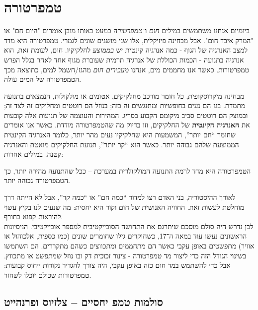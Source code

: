 \documentclass[
  hebrew,
  letterpaper,
  DIV=11,
  numbers=noendperiod]{scrreprt}
\begin{document}
\section{\texorpdfstring{{טמפרטורה}}{טמפרטורה}}\label{ux5d8ux5deux5e4ux5e8ux5d8ux5d5ux5e8ux5d4}

{ביומיום אנחנו משתמשים במילים \emph{חום} ו־\emph{טמפרטורה} כמעט באותו
מובן אומרים "היום חם" או "המרק איבד חום". אבל מבחינה פיזיקלית, אלו שני
מושגים שונים לגמרי}. {טמפרטורה היא מדד למצב האנרגיה של הגוף - כמה אנרגיה
קינטית יש \emph{בממוצע} לחלקיקיו}. {חום,} {לעומת זאת, הוא אנרגיה בתנועה
-} {הכמות הכוללת של אנרגיה תרמית שעוברת מגוף אחד לאחר בגלל הפרש
טמפרטורות}. {כאשר אנו מחממים מים, אנחנו \emph{מעבירים חום} מהגז/חשמל
למים, כתוצאה מכך הטמפרטורה של המים עולה}.

{מבחינה מיקרוסקופית, כל חומר מורכב מחלקיקים, אטומים או מולקולות, הנמצאים
בתנועה מתמדת}. {בגז הם נעים בחופשיות ומתנגשים זה בזה; בנוזל הם רוטטים
ומחליקים זה לצד זה; ובמוצק הם רוטטים סביב מיקומם הקבוע בסריג}. {המהירות
והעוצמה של תנועות אלה קובעות את \textbf{האנרגיה הקינטית} של החלקיקים,
וזו בדיוק מה שהטמפרטורה מודדת}. {כאשר אנו אומרים שחומר ``חם יותר'',
המשמעות היא שחלקיקיו נעים מהר יותר, כלומר האנרגיה הקינטית הממוצעת שלהם
גבוהה יותר}. {כאשר הוא ``קר יותר'', תנועת החלקיקים מואטת והאנרגיה קטנה}.
{במילים אחרות}:

{הטמפרטורה היא מדד לרמת התנועה המולקולרית במערכת -- ככל שהתנועה מהירה
יותר, כך הטמפרטורה גבוהה יותר}.

{לאורך ההיסטוריה, בני האדם רצו למדוד ``כמה חם'' או ``כמה קר'', אבל לא
הייתה דרך מוחלטת לעשות זאת}. {החוויה האנושית של חום וקור היא יחסית: מה
שנעים לנו בקיץ עשוי להיראות קפוא בחורף}.\\
{לכן נדרש היה סולם מוסכם שיתרגם את התחושה הסובייקטיבית למספר
אובייקטיבי}. {הניסיונות הראשונים נעשו עוד במאה ה־17, כשחוקרים גילו
שחומרים שונים (כמו כספית, אלכוהול או אוויר) מתפשטים באופן עקבי כאשר הם
מתחממים ומתכווצים כשהם מתקררים}. {הם השתמשו בשינוי הגודל הזה כדי ליצור
מד טמפרטורה} - {צינור זכוכית דק ובו נוזל שמתפשט או מתכווץ}. {אבל כדי
להשתמש במד חום כזה באופן עקבי, היה צורך להגדיר נקודות ייחוס קבועות:
טמפרטורות שכולם יוכלו לשחזר}.

\subsection{\texorpdfstring{{סולמות טמפ\textquotesingle{} יחסיים --
צלזיוס
ופרנהייט}}{סולמות טמפ\textquotesingle{} יחסיים -- צלזיוס ופרנהייט}}\label{ux5e1ux5d5ux5dcux5deux5d5ux5ea-ux5d8ux5deux5e4-ux5d9ux5d7ux5e1ux5d9ux5d9ux5dd-ux5e6ux5dcux5d6ux5d9ux5d5ux5e1-ux5d5ux5e4ux5e8ux5e0ux5d4ux5d9ux5d9ux5d8}
\end{document}

